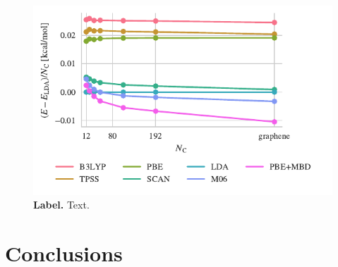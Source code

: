 \begin{figure}
\centering
\includegraphics{../media/flakes}
\caption{\textbf{Label.}
Text.
\label{fig:flakes}
}
\end{figure}

\section{Conclusions}

